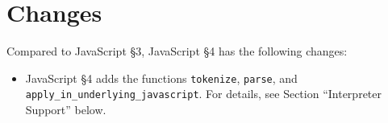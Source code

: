 





\section{Changes}

Compared to JavaScript \S 3, JavaScript \S 4 has the following changes:
\begin{itemize}
\item JavaScript \S 4 adds the functions \lstinline{tokenize}, \lstinline{parse}, and
\lstinline{apply_in_underlying_javascript}.
For details, see
Section ``Interpreter Support'' below.
\end{itemize}





\newpage







































\newpage



\newpage



    
